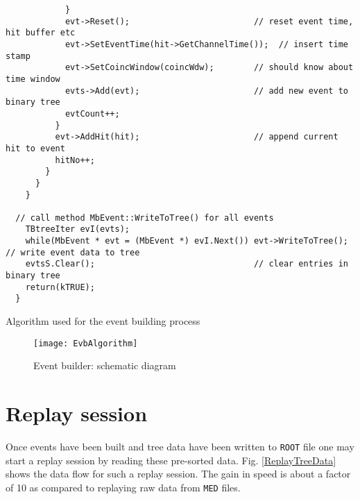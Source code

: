 \documentclass[10pt]{article}
\newenvironment{yellowboxed}
	{\begin{Sbox}\begin{minipage}[t]}
	{\end{minipage}\end{Sbox}\colorbox{yellow}{\TheSbox}}
\begin{document}
\begin{center}
\begin{table}[H]
{\begin{yellowboxed}{\linewidth}
\verb+            }+\\
\verb+            evt->Reset();                         // reset event time, hit buffer etc+\\
\verb+            evt->SetEventTime(hit->GetChannelTime());  // insert time stamp+\\
\verb+            evt->SetCoincWindow(coincWdw);        // should know about time window+\\
\verb+            evts->Add(evt);                       // add new event to binary tree+\\
\verb-            evtCount++;-\\
\verb+          }+\\
\verb+          evt->AddHit(hit);                       // append current hit to event+\\
\verb-          hitNo++;-\\
\verb+        }+\\
\verb+      }+\\
\verb+    }+\\
\verb+  +\\
\verb+  // call method MbEvent::WriteToTree() for all events+\\
\verb+	  TBtreeIter evI(evts);+\\
\verb+	  while(MbEvent * evt = (MbEvent *) evI.Next()) evt->WriteToTree();  // write event data to tree+\\
\verb+	  evtsS.Clear();                                // clear entries in binary tree+\\
\verb+	  return(kTRUE);+\\
\verb+  }+
\end{yellowboxed}}
\caption{Algorithm used for the event building process}
\label{TabEvbAlgorithm}
\end{table}
\end{center}
\newpage
\begin{figure}[H]
\centerline{\texttt{[image: EvbAlgorithm]}}
\caption{Event builder: schematic diagram}
\label{FigEvbAlgorithm}
\end{figure}
\newpage
\section{Replay session}\label{ReplaySession}
Once events have been built and tree data have been written to \texttt{ROOT} file one may start a replay session
by reading these pre-sorted data. Fig. \ref{ReplayTreeData} shows the data flow for such a replay session.
The gain in speed is about a factor of 10 as compared to replaying raw data from \texttt{MED} files.
\end{document}
